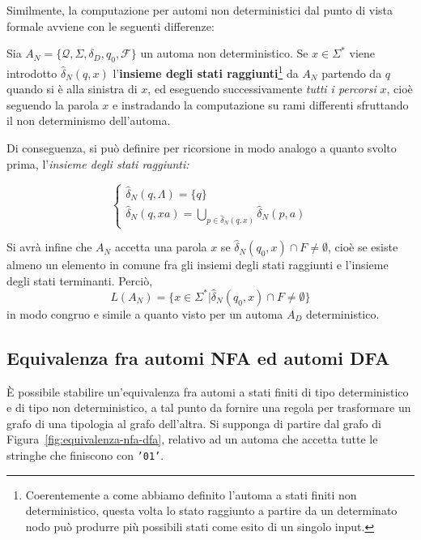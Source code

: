\documentclass[10pt]{\classname}
\theoremstyle{newlinethm}
\theoremstyle{theorem}
\theoremstyle{definition}
\theoremstyle{definition}
\theoremstyle{definition}
\theoremstyle{definition}
\begin{document}
Similmente, la computazione per automi non deterministici dal punto di vista
formale avviene con le seguenti differenze:

Sia $A_N = \{ \mathcal Q, \Sigma, \delta_D, q_0, \mathcal F\}$ un automa non
deterministico. Se $x\in \Sigma^*$ viene introdotto $\hat{\delta}_N (q, x)$
l'\textbf{insieme degli stati raggiunti}\footnote{Coerentemente a come abbiamo
definito l'automa a stati finiti non deterministico, questa volta lo stato
raggiunto a partire da un determinato nodo può produrre più possibili stati
come esito di un singolo input.} da $A_N$ partendo da $q$ quando si è alla
sinistra di $x$, ed eseguendo successivamente \emph{tutti i percorsi} $x$, cioè seguendo la parola $x$ e instradando la computazione su rami differenti sfruttando il non determinismo dell'automa.

Di conseguenza, si può definire per ricorsione in modo analogo a quanto svolto prima, l'\emph{insieme degli stati raggiunti:}

$$
\left\{
    \begin{array}{l}
        \hat{\delta}_N (q, \Lambda) = \{q\} \\
        \hat{\delta}_N (q, xa) = \displaystyle \bigcup_{p \in \hat{\delta}_N(q, x)} \hat{\delta}_N (p, a)
    \end{array}
\right.
$$

Si avrà infine che $A_N$ accetta una parola $x$ se $\hat{\delta}_N(q_0, x) \cap F
\neq \emptyset$, cioè se esiste almeno un elemento in comune fra gli insiemi degli stati raggiunti e l'insieme degli stati terminanti. Perciò,
\[L(A_N) = \{x \in \Sigma^* | \hat{\delta}_N(q_0, x) \cap F \neq \emptyset \}\]
in modo congruo e simile a quanto visto per un automa $A_D$ deterministico.

\subsection{Equivalenza fra automi NFA ed automi DFA}

È possibile stabilire un'equivalenza fra automi a stati finiti di tipo
deterministico e di tipo non deterministico, a tal punto da fornire una regola
per trasformare un grafo di una tipologia al grafo dell'altra. Si supponga di
partire dal grafo di Figura~\ref{fig:equivalenza-nfa-dfa}, relativo ad un
automa che accetta tutte le stringhe che finiscono con \texttt{'01'}.
\end{document}
